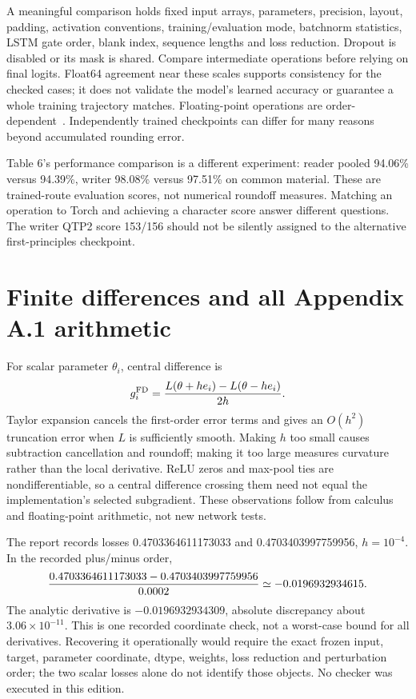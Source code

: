 A meaningful comparison holds fixed input arrays, parameters, precision,
layout, padding, activation conventions, training/evaluation mode, batchnorm
statistics, LSTM gate order, blank index, sequence lengths and loss reduction.
Dropout is disabled or its mask is shared. Compare intermediate operations
before relying on final logits. Float64 agreement near these scales supports
consistency for the checked cases; it does not validate the model's learned
accuracy or guarantee a whole training trajectory matches. Floating-point
operations are order-dependent~\cite{torchnumeric}. Independently trained
checkpoints can differ for many reasons beyond accumulated rounding error.

Table 6's performance comparison is a different experiment: reader pooled
94.06\% versus 94.39\%, writer 98.08\% versus 97.51\% on common material.
These are trained-route evaluation scores, not numerical roundoff measures.
Matching an operation to Torch and achieving a character score answer
different questions. The writer QTP2 score 153/156 should not be silently
assigned to the alternative first-principles checkpoint.

\section{Finite differences and all Appendix A.1 arithmetic}
For scalar parameter $\theta_i$, central difference is
\[
g_i^{\rm FD}={L(\theta+h e_i)-L(\theta-h e_i)\over2h}.
\]
Taylor expansion cancels the first-order error terms and gives an $O(h^2)$
truncation error when $L$ is sufficiently smooth. Making $h$ too small
causes subtraction cancellation and roundoff; making it too large measures
curvature rather than the local derivative. ReLU zeros and max-pool ties
are nondifferentiable, so a central difference crossing them need not equal
the implementation's selected subgradient. These observations follow from
calculus and floating-point arithmetic, not new network tests.

The report records losses 0.4703364611173033 and 0.4703403997759956,
$h=10^{-4}$. In the recorded plus/minus order,
\[
{0.4703364611173033-0.4703403997759956\over0.0002}
\simeq-0.0196932934615.
\]
The analytic derivative is $-0.0196932934309$, absolute discrepancy
about $3.06\times10^{-11}$. This is one recorded coordinate check,
not a worst-case bound for all derivatives. Recovering it operationally
would require the exact frozen input, target, parameter coordinate, dtype,
weights, loss reduction and perturbation order; the two scalar losses alone
do not identify those objects. No checker was executed in this edition.

